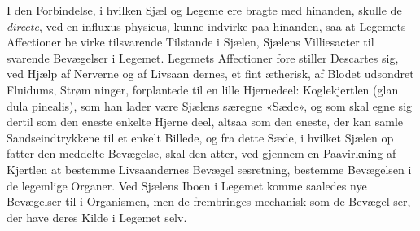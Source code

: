\documentclass[12pt,a4paper]{book}
\begin{document}
I den Forbindelse, i hvilken Sjæl og Legeme ere bragte
med hinanden, skulle de \emph{directe}, ved en influxus physicus,
kunne indvirke paa hinanden, saa at Legemets Affectioner be\-%
virke tilsvarende Tilstande i Sjælen, Sjælens Villiesacter til\-%
svarende Bevægelser i Legemet. Legemets Affectioner fore\-%
stiller Descartes sig, ved Hjælp af Nerverne og af Livsaan\-%
dernes, et fint ætherisk, af Blodet udsondret Fluidums, Strøm\-%
ninger, forplantede til en lille Hjernedeel: Koglekjertlen (glan\-%
dula pinealis), som han lader være Sjælens særegne «Sæde»,
og som skal egne sig dertil som den eneste enkelte Hjerne\-%
deel, altsaa som den eneste, der kan samle Sandseindtrykkene
til et enkelt Billede, og fra dette Sæde, i hvilket Sjælen op\-%
fatter den meddelte Bevægelse, skal den atter, ved gjennem en
Paavirkning af Kjertlen at bestemme Livsaandernes Bevægel\-%
sesretning, bestemme Bevægelsen i de legemlige Organer. Ved
Sjælens Iboen i Legemet komme saaledes nye Bevægelser til i
Organismen, men de frembringes mechanisk som de Bevægel\-%
ser, der have deres Kilde i Legemet selv.
\end{document}
